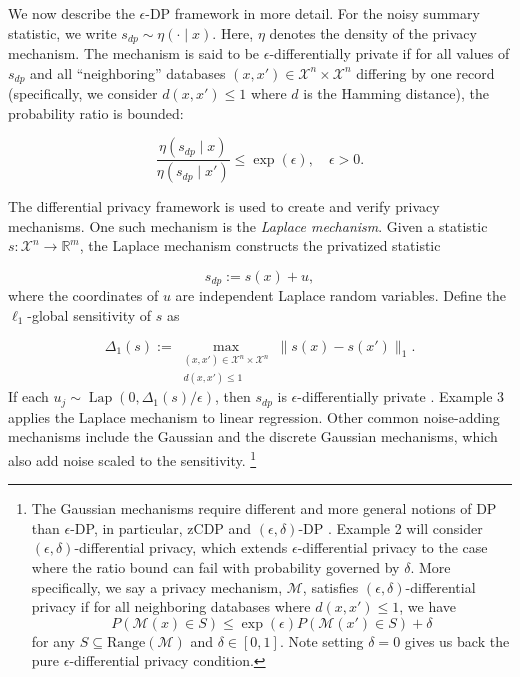 We now describe the \(\epsilon\)-DP framework in more detail. For the noisy summary
statistic, we write \(s_{dp} \sim \eta(\cdot \mid x)\). Here, \(\eta\) denotes the
density of the privacy mechanism. The mechanism is said to be
\(\epsilon\)-differentially private \citep{Dwork2006} if for all values of \(s_{dp}\)
and all ``neighboring'' databases \((x,x') \in \mathcal{X}^n \times \mathcal{X}^n\) differing
by one record (specifically, we consider \(d(x,x') \leq 1\) where \(d\) is the Hamming distance), the probability ratio is bounded:

\begin{equation*}
\dfrac{\eta(s_{dp} \mid x)}{\eta(s_{dp} \mid x')} \leq \exp(\epsilon), \quad \epsilon > 0.
\end{equation*}

The differential privacy framework is used to create and verify privacy
mechanisms. One such mechanism is the \emph{Laplace mechanism}. Given a statistic
\(s: \mathcal{X}^n \to \mathbb{R}^m\), the Laplace mechanism constructs the
privatized statistic

\begin{equation*}
s_{dp} := s(x) + u,
\end{equation*}
where the coordinates of \(u\) are independent Laplace random variables. Define
the \(\ell_1\)-global sensitivity of \(s\) as

\begin{equation*}
\Delta_1(s) :=
\max_{\substack{(x,x') \in \mathcal{X}^n \times \mathcal{X}^n \\ d(x,x') \leq 1}}
\lVert s(x) - s(x') \rVert_1.
\end{equation*}
If each \(u_j \sim \operatorname{Lap}(0, \Delta_1(s) / \epsilon)\), then \(s_{dp}\)
is \(\epsilon\)-differentially private \citep{Dwork2006}. Example 3 applies the Laplace
mechanism to linear regression.
Other common noise-adding mechanisms include the Gaussian and the
discrete Gaussian mechanisms, which also add noise scaled to the sensitivity. \footnote{The
  Gaussian mechanisms require different and more general notions of DP than \(\epsilon\)-DP,
  in particular, zCDP \citep{Bun2016} and \((\epsilon, \delta)\)-DP \citep{Dwork2006p}.
  Example 2 will consider \((\epsilon, \delta)\)-differential privacy, which
  extends \(\epsilon\)-differential privacy to the case where the ratio bound
  can fail with probability governed by \(\delta\). More specifically, we say
  a privacy mechanism, \(\mathcal{M}\), satisfies \((\epsilon, \delta)\)-differential privacy if
  for all neighboring databases where \(d(x,x') \leq 1\), we have
  \[
  P(\mathcal{M}(x) \in S) \leq \exp(\epsilon)
  P(\mathcal{M}(x') \in S) + \delta
  \]
  for any \(S \subseteq \text{Range}(\mathcal{M})\) and \(\delta \in [0,1]\). Note
  setting \(\delta = 0\) gives us back the pure \(\epsilon\)-differential privacy
  condition.}

